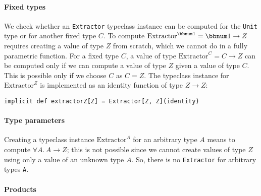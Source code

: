 \paragraph{Fixed types}

We check whether an \lstinline!Extractor! typeclass instance can
be computed for the \lstinline!Unit! type or for another fixed type
$C$. To compute $\text{Extractor}^{\bbnum 1}=\bbnum 1\rightarrow Z$
requires creating a value of type $Z$ from scratch, which we cannot
do in a fully parametric function. For a fixed type $C$, a value
of type $\text{Extractor}^{C}=C\rightarrow Z$ can be computed only
if we can compute a value of type $Z$ given a value of type $C$.
This is possible only if we choose $C$ as $C=Z$. The typeclass instance
for $\text{Extractor}^{Z}$ is implemented as an identity function
of type $Z\rightarrow Z$:
\begin{lstlisting}
implicit def extractorZ[Z] = Extractor[Z, Z](identity)
\end{lstlisting}


\paragraph{Type parameters}

Creating a typeclass instance $\text{Extractor}^{A}$ for an arbitrary
type $A$ means to compute $\forall A.\,A\rightarrow Z$; this is
not possible since we cannot create values of type $Z$ using only
a value of an unknown type $A$. So, there is no \lstinline!Extractor!
for arbitrary types \lstinline!A!.

\paragraph{Products}

